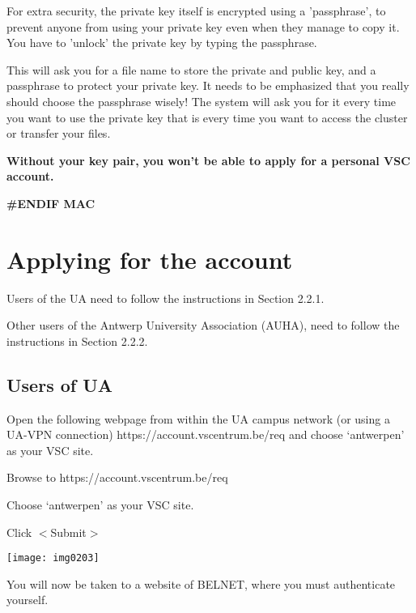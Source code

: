 For extra security, the private key itself is encrypted using a 'passphrase', to prevent anyone from using your private key even when they manage to copy it. You have to 'unlock' the private key by typing the passphrase.



This will ask you for a file name to store the private and public key, and a passphrase to protect your private key. It needs to be emphasized that you really should choose the passphrase wisely! The system will ask you for it every time you want to use the private key that is every time you want to access the cluster or transfer your files.


\textbf{Without your key pair, you won't be able to apply for a personal VSC account.}

\textbf{\#ENDIF MAC}


\section{Applying for the account}


Users of the UA need to follow the instructions in Section 2.2.1.

Other users of the Antwerp University Association (AUHA), need to follow the instructions in Section 2.2.2.


\subsection{Users of UA}

Open the following webpage from within the UA campus network (or using a UA-VPN connection) https://account.vscentrum.be/req and choose `antwerpen' as your VSC site.


Browse to https://account.vscentrum.be/req

Choose `antwerpen' as your VSC site.

Click $<$Submit$>$


\texttt{[image: img0203]}


You will now be taken to a website of BELNET, where you must authenticate yourself.

